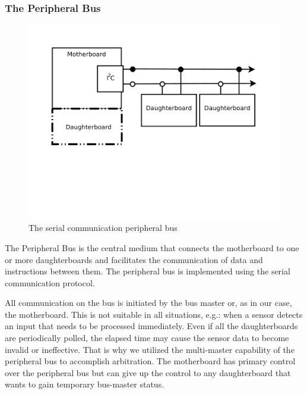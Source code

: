 	
	\subsubsection{The Peripheral Bus} %
	\label{ssub:the_peripheral_bus}
	
	\begin{figure}[h]
	  \begin{center}
	    \includegraphics[width=1.0\columnwidth]{Figures/pbus.pdf}
	    \caption{The serial communication peripheral \iic bus}
	  \end{center}
	\end{figure}

	The Peripheral Bus is the central medium that connects the motherboard to one or more daughterboards and facilitates the communication of data and instructions between them. The peripheral bus is implemented using the \iic serial communication protocol. 
	
	All communication on the \iic bus is initiated by the bus master or, as in our case, the motherboard. This is not suitable in all situations, e.g.: when a sensor detects an input that needs to be processed immediately. Even if all the daughterboards are periodically polled, the elapsed time may cause the sensor data to become invalid or ineffective. That is why we utilized the multi-master capability of the \iic peripheral bus to accomplish arbitration. The motherboard has primary control over the peripheral bus but can give up the control to any daughterboard that wants to gain temporary bus-master status. 

